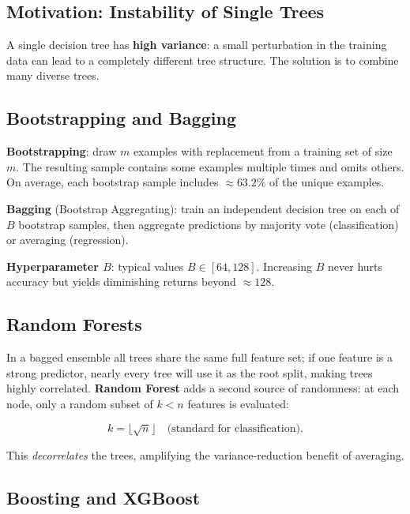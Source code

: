 \subsection{Motivation: Instability of Single Trees}

A single decision tree has \textbf{high variance}: a small perturbation in the
training data can lead to a completely different tree structure. The solution is
to combine many diverse trees.

\subsection{Bootstrapping and Bagging}

\textbf{Bootstrapping}: draw $m$ examples with replacement from a training set
of size $m$. The resulting sample contains some examples multiple times and
omits others. On average, each bootstrap sample includes $\approx63.2\%$ of the
unique examples.

\textbf{Bagging} (Bootstrap Aggregating): train an independent decision tree on
each of $B$ bootstrap samples, then aggregate predictions by majority vote
(classification) or averaging (regression).

\textbf{Hyperparameter $B$}: typical values $B\in[64,128]$. Increasing $B$
never hurts accuracy but yields diminishing returns beyond $\approx128$.

\subsection{Random Forests}
\label{sec:rf}

In a bagged ensemble all trees share the same full feature set; if one feature
is a strong predictor, nearly every tree will use it as the root split, making
trees highly correlated. \textbf{Random Forest} adds a second source of
randomness: at each node, only a random subset of $k<n$ features is evaluated:

\begin{equation}
k=\lfloor\sqrt{n}\rfloor\quad\text{(standard for classification)}.
\label{eq:rf-k}
\end{equation}

This \emph{decorrelates} the trees, amplifying the variance-reduction benefit
of averaging.

\subsection{Boosting and XGBoost}

